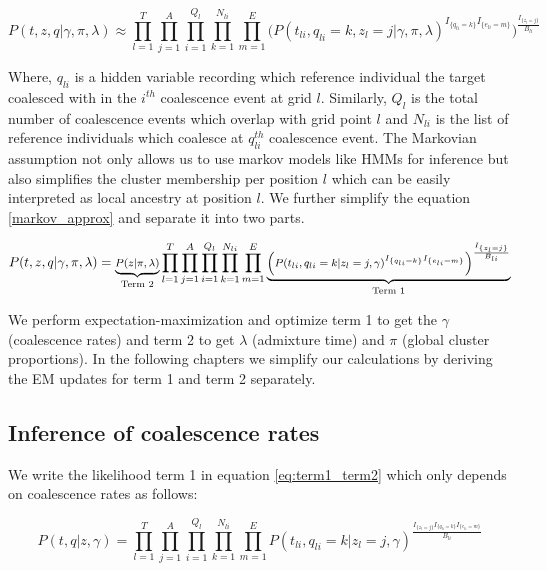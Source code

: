 \begin{equation}
    P (t,z,q \vert \gamma, \pi, \lambda) \approx \prod_{l =1}^{T} \prod_{j = 1}^A \prod_{i = 1}^{Q_l} \prod_{k =1}^{N_{li}} \prod_{m = 1}^E \Big( P(t_{li}, q_{li} = k, z_l = j \vert \gamma, \pi, \lambda) ^ {I_{\{q_{l i} = k\}}  I_{\{e_{l i} = m\}}} \Big) ^{\frac{I_{\{z_l = j\}}}{B_{li}}}
    \label{markov_approx}
\end{equation}

Where, $q_{li}$ is a hidden variable recording which reference individual the target coalesced with in the $i^{th}$ coalescence event at grid $l$. Similarly, $Q_{l}$ is the total number of coalescence events which overlap with grid point $l$ and $N_{li}$ is the list of reference individuals which coalesce at $q_{li}^{th}$ coalescence event. The Markovian assumption not only allows us to use markov models like HMMs for inference but also simplifies the cluster membership per position $l$ which can be easily interpreted as local ancestry at position $l$. We further simplify the equation \ref{markov_approx} and separate it into two parts.

\begin{equation}
    \footnotesize
    P (t,z,q \vert \gamma, \pi, \lambda) = \underbrace{P(z \vert \pi, \lambda)}_{\text{Term 2}} \prod_{l =1}^{T} \prod_{j = 1}^A \prod_{i = 1}^{Q_l} \prod_{k =1}^{N_{li}} \prod_{m = 1}^E \underbrace{\Big( P(t_{li}, q_{li} = k \vert z_l = j, \gamma) ^ {I_{\{q_{l i} = k\}}  I_{\{e_{l i} = m\}}} \Big) ^{\frac{I_{\{z_l = j\}}}{B_{li}}}}_{\text{Term 1}}
    \label{eq:term1_term2}
\end{equation}

We perform expectation-maximization and optimize term 1 to get the $\gamma$ (coalescence rates) and term 2 to get $\lambda$ (admixture time) and $\pi$ (global cluster proportions). In the following chapters we simplify our calculations by deriving the EM updates for term 1 and term 2 separately. 

\subsection{Inference of coalescence rates}
We write the likelihood term 1 in equation \ref{eq:term1_term2} which only depends on coalescence rates as follows: 

\begin{equation}
     P(t, q \vert z, \gamma) = \prod_{l = 1}^T \prod_{j = 1}^A \prod_{i = 1}^{Q_l} \prod_{k =1}^{N_{li}} \prod_{m = 1}^E   P(t_{li}, q_{l i} = k \vert z_l = j, \gamma) ^ {\frac{I_{\{z_l = j\}}I_{\{q_{l i} = k\}}  I_{\{e_{l i} = m\}}}{B_{li}}}
\label{eq:scaled_ll}
\end{equation}

